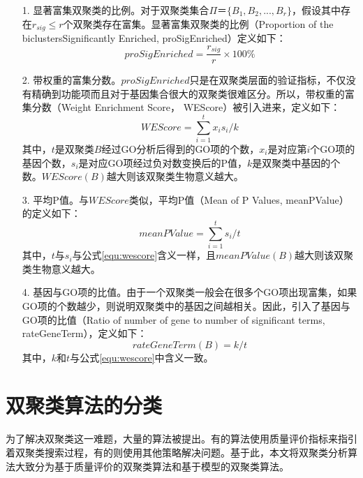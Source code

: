   \begin{enumerate}
    \item[1.] 显著富集双聚类的比例。对于双聚类集合$\Pi＝\{B_1,B_2,...,B_r\}$，假设其中存在$r_{sig} \le r$个双聚类存在富集。显著富集双聚类的比例（Proportion of the biclustersSignificantly Enriched, proSigEnriched）定义如下：
    \begin{equation}
      proSigEnriched = \frac{r_{sig}}{r} \times 100\%
    \end{equation}

    \item[2.] 带权重的富集分数。$proSigEnriched$只是在双聚类层面的验证指标，不仅没有精确到功能项而且对于基因集合很大的双聚类很难区分。所以，带权重的富集分数（Weight Enrichment Score， WEScore）被引入进来，定义如下：
    \begin{equation}\label{equ:wescore}
      WEScore = \sum_{i=1}^t{x_i s_i}/k
    \end{equation}
    \hspace{2em}其中，$t$是双聚类$B$经过GO分析后得到的GO项的个数，$x_i$是对应第$i$个GO项的基因个数，$s_i$是对应GO项经过负对数变换后的P值，$k$是双聚类中基因的个数。$WEScore(B)$越大则该双聚类生物意义越大。

    \item[3.] 平均P值。与$WEScore$类似，平均P值（Mean of P Values, meanPValue）的定义如下：
    \begin{equation}\label{equ:meanP}
      meanPValue = \sum_{i=1}^ts_i/t
    \end{equation}
    \hspace{2em}其中，$t$与$s_i$与公式\ref{equ:wescore}含义一样，且$meanPValue(B)$越大则该双聚类生物意义越大。

    \item[4.] 基因与GO项的比值。由于一个双聚类一般会在很多个GO项出现富集，如果GO项的个数越少，则说明双聚类中的基因之间越相关。因此，引入了基因与GO项的比值（Ratio of number of gene to number of significant terms, rateGeneTerm），定义如下：
    \begin{equation}
     rateGeneTerm(B) = k / t 
    \end{equation}
    \hspace{2em}其中，$k$和$t$与公式\ref{equ:wescore}中含义一致。
  \end{enumerate}

\section{双聚类算法的分类}
为了解决双聚类这一难题，大量的算法被提出。有的算法使用质量评价指标来指引着双聚类搜索过程，有的则使用其他策略解决问题。基于此，本文将双聚类分析算法大致分为基于质量评价的双聚类算法和基于模型的双聚类算法。


